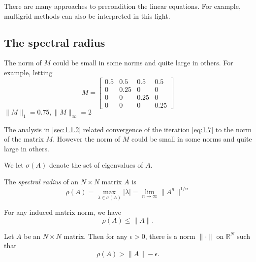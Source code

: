 \begin{rmk}
  There are many approaches to precondition the linear equations. For
  example, multigrid methods can also be interpreted in this light.
\end{rmk}

\subsection{The spectral radius}
\label{sec:1.3}
\begin{exm}
  The norm of $M$ could be small in some norms and quite large in
  others. For example, letting
  $$
  M=\left[\begin{array}{cccc}
    0.5 & 0.5 & 0.5 & 0.5 \\
    0 & 0.25 & 0 & 0 \\
    0 & 0 & 0.25 & 0 \\
    0 & 0 & 0 & 0.25
  \end{array}\right]
  $$
  $\|M\|_1=0.75,\|M\|_{\infty}=2$
\end{exm}

\begin{rmk}
  The analysis in \ref{sec:1.1.2} related convergence of the iteration
  \eqref{eq:1.7} to the norm of the matrix $M$. However the norm of $M$
  could be small in some norms and quite large in others.
\end{rmk}

\begin{nota}
  We let $\sigma(A)$ denote the set of eigenvalues of $A$.
\end{nota}

\begin{defi}
  The \emph{spectral radius} of an $N\times N$ matrix $A$ is
  \begin{equation}
    \label{eq:1.13}
    \rho(A)= \max_{\lambda\in\sigma(A)}|\lambda| =
    \lim\limits_{n\rightarrow\infty}\|A^{n}\|^{1/n}
  \end{equation}
\end{defi}

\begin{lemma}
  For any induced matrix norm, we have
  \begin{equation}
    \label{eq:1.14}
    \rho(A)\leq \|A\|.
  \end{equation}
\end{lemma}

\begin{thm}
  Let $A$ be an $N\times N$ matrix. Then for any $\epsilon>0$, there is
  a norm $\|\cdot\|$ on $\mathbb{R}^N$ such that $$\rho(A)>\|A\|-\epsilon.$$
\end{thm}


